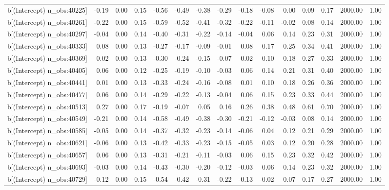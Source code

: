 \begin{table}[ht]
\begin{tabular}{rrrrrrrrrrrrrrr}
  b[(Intercept) n\_obs:40225] & -0.19 & 0.00 & 0.15 & -0.56 & -0.49 & -0.38 & -0.29 & -0.18 & -0.08 & 0.00 & 0.09 & 0.17 & 2000.00 & 1.00 \\ 
  b[(Intercept) n\_obs:40261] & -0.22 & 0.00 & 0.15 & -0.59 & -0.52 & -0.41 & -0.32 & -0.22 & -0.11 & -0.02 & 0.08 & 0.14 & 2000.00 & 1.00 \\ 
  b[(Intercept) n\_obs:40297] & -0.04 & 0.00 & 0.14 & -0.40 & -0.31 & -0.22 & -0.14 & -0.04 & 0.06 & 0.14 & 0.23 & 0.31 & 2000.00 & 1.00 \\ 
  b[(Intercept) n\_obs:40333] & 0.08 & 0.00 & 0.13 & -0.27 & -0.17 & -0.09 & -0.01 & 0.08 & 0.17 & 0.25 & 0.34 & 0.41 & 2000.00 & 1.00 \\ 
  b[(Intercept) n\_obs:40369] & 0.02 & 0.00 & 0.13 & -0.30 & -0.24 & -0.15 & -0.07 & 0.02 & 0.10 & 0.18 & 0.27 & 0.33 & 2000.00 & 1.00 \\ 
  b[(Intercept) n\_obs:40405] & 0.06 & 0.00 & 0.12 & -0.25 & -0.19 & -0.10 & -0.03 & 0.06 & 0.14 & 0.21 & 0.31 & 0.40 & 2000.00 & 1.00 \\ 
  b[(Intercept) n\_obs:40441] & 0.01 & 0.00 & 0.13 & -0.33 & -0.24 & -0.16 & -0.08 & 0.01 & 0.10 & 0.18 & 0.26 & 0.36 & 2000.00 & 1.00 \\ 
  b[(Intercept) n\_obs:40477] & 0.06 & 0.00 & 0.14 & -0.29 & -0.22 & -0.13 & -0.04 & 0.06 & 0.15 & 0.23 & 0.33 & 0.44 & 2000.00 & 1.00 \\ 
  b[(Intercept) n\_obs:40513] & 0.27 & 0.00 & 0.17 & -0.19 & -0.07 & 0.05 & 0.16 & 0.26 & 0.38 & 0.48 & 0.61 & 0.70 & 2000.00 & 1.00 \\ 
  b[(Intercept) n\_obs:40549] & -0.21 & 0.00 & 0.14 & -0.58 & -0.49 & -0.38 & -0.30 & -0.21 & -0.12 & -0.03 & 0.08 & 0.14 & 2000.00 & 1.00 \\ 
  b[(Intercept) n\_obs:40585] & -0.05 & 0.00 & 0.14 & -0.37 & -0.32 & -0.23 & -0.14 & -0.06 & 0.04 & 0.12 & 0.21 & 0.29 & 2000.00 & 1.00 \\ 
  b[(Intercept) n\_obs:40621] & -0.06 & 0.00 & 0.13 & -0.42 & -0.33 & -0.23 & -0.15 & -0.05 & 0.03 & 0.12 & 0.20 & 0.28 & 2000.00 & 1.00 \\ 
  b[(Intercept) n\_obs:40657] & 0.06 & 0.00 & 0.13 & -0.31 & -0.21 & -0.11 & -0.03 & 0.06 & 0.15 & 0.23 & 0.32 & 0.42 & 2000.00 & 1.00 \\ 
  b[(Intercept) n\_obs:40693] & -0.03 & 0.00 & 0.14 & -0.43 & -0.30 & -0.20 & -0.12 & -0.03 & 0.06 & 0.14 & 0.23 & 0.32 & 2000.00 & 1.00 \\ 
  b[(Intercept) n\_obs:40729] & -0.12 & 0.00 & 0.15 & -0.54 & -0.42 & -0.31 & -0.22 & -0.13 & -0.02 & 0.07 & 0.17 & 0.27 & 2000.00 & 1.00 \\ 

\end{tabular}
\end{table}
